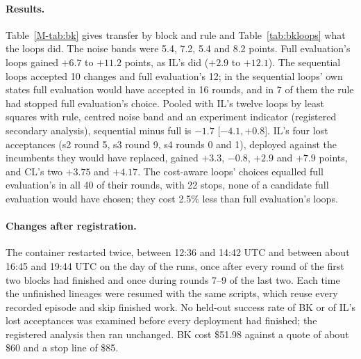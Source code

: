 \documentclass[11pt]{article}
\begin{document}
\paragraph{Results.} Table~\ref*{M-tab:bk} gives transfer by block and rule and Table~\ref{tab:bkloops} what the loops did. The noise bands were 5.4, 7.2, 5.4 and 8.2 points. Full evaluation's loops gained $+6.7$ to $+11.2$ points, as IL's did ($+2.9$ to $+12.1$). The sequential loops accepted 10 changes and full evaluation's 12; in the sequential loops' own states full evaluation would have accepted in 16 rounds, and in 7 of them the rule had stopped full evaluation's choice. Pooled with IL's twelve loops by least squares with rule, centred noise band and an experiment indicator (registered secondary analysis), sequential minus full is $-1.7$ [$-4.1,+0.8$]. IL's four lost acceptances (s2 round 5, s3 round 9, s4 rounds 0 and 1), deployed against the incumbents they would have replaced, gained $+3.3$, $-0.8$, $+2.9$ and $+7.9$ points, and CL's two $+3.75$ and $+4.17$. The cost-aware loops' choices equalled full evaluation's in all 40 of their rounds, with 22 stops, none of a candidate full evaluation would have chosen; they cost 2.5\% less than full evaluation's loops.

\paragraph{Changes after registration.} The container restarted twice, between 12:36 and 14:42 UTC and between about 16:45 and 19:44 UTC on the day of the runs, once after every round of the first two blocks had finished and once during rounds 7--9 of the last two. Each time the unfinished lineages were resumed with the same scripts, which reuse every recorded episode and skip finished work. No held-out success rate of BK or of IL's lost acceptances was examined before every deployment had finished; the registered analysis then ran unchanged. BK cost \$51.98 against a quote of about \$60 and a stop line of \$85.
\end{document}
